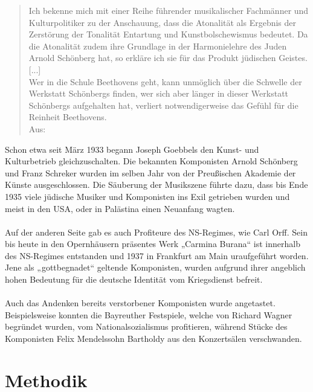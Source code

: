 \documentclass[ngerman]{ttlab-qualify}
\begin{document}
\begin{quote}Ich bekenne mich mit einer Reihe führender musikalischer Fachmänner und Kulturpolitiker zu der Anschauung, dass die Atonalität als Ergebnis der Zerstörung der Tonalität Entartung und Kunstbolschewismus bedeutet. Da die Atonalität zudem ihre Grundlage in der Harmonielehre des Juden Arnold Schönberg hat, so erkläre ich sie für das Produkt jüdischen Geistes. [...] \\
Wer in die Schule Beethovens geht, kann unmöglich über die Schwelle der Werkstatt Schönbergs finden, wer sich aber länger in dieser Werkstatt Schönbergs aufgehalten hat, verliert notwendigerweise das Gefühl für die Reinheit Beethovens.\\
Aus: \textcite[Rede Hans Severus Zieglers vom 25. Mai 1938, auf CD bereitgestellt vom Deutschen Rundfunkarchiv]{saxophon}\end{quote}
Schon etwa seit März 1933 begann Joseph Goebbels den Kunst- und Kulturbetrieb gleichzuschalten. Die bekannten Komponisten Arnold Schönberg und Franz Schreker wurden im selben Jahr von der Preußischen Akademie der Künste ausgeschlossen. Die Säuberung der Musikszene führte dazu, dass bis Ende 1935 viele jüdische Musiker und Komponisten ins Exil getrieben wurden und meist in den USA, oder in Palästina einen Neuanfang wagten.\\ 
\\
Auf der anderen Seite gab es auch Profiteure des NS-Regimes, wie Carl Orff. Sein bis heute in den Opernhäusern präsentes Werk „Carmina Burana“ ist innerhalb des NS-Regimes entstanden und 1937 in Frankfurt am Main uraufgeführt worden.\\
Jene als „gottbegnadet“ geltende Komponisten, wurden aufgrund ihrer angeblich hohen Bedeutung für die deutsche Identität vom Kriegsdienst befreit.\\ 
\\
Auch das Andenken bereits verstorbener Komponisten wurde angetastet. Beispielsweise konnten die Bayreuther Festspiele, welche von Richard Wagner begründet wurden, vom Nationalsozialismus profitieren, während Stücke des Komponisten Felix Mendelssohn Bartholdy aus den Konzertsälen verschwanden.

\chapter{Methodik} \label{Methodik}
\end{document}
